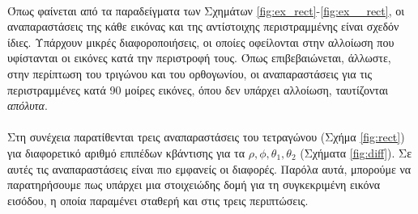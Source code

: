 \paragraph*{}
Όπως φαίνεται από τα παραδείγματα των Σχημάτων \ref{fig:ex_rect}-\ref{fig:ex__rect}, οι αναπαραστάσεις της κάθε εικόνας και της αντίστοιχης περιστραμμένης είναι σχεδόν ίδιες. Υπάρχουν μικρές διαφοροποιήσεις, οι οποίες οφείλονται στην αλλοίωση που υφίστανται οι εικόνες κατά την περιστροφή τους. Όπως επιβεβαιώνεται, άλλωστε, στην περίπτωση του τριγώνου και του ορθογωνίου, οι αναπαραστάσεις για τις περιστραμμένες κατά 90 μοίρες εικόνες, όπου δεν υπάρχει αλλοίωση, ταυτίζονται \textit{απόλυτα}.

\paragraph*{}
Στη συνέχεια παρατίθενται τρεις αναπαραστάσεις του τετραγώνου (Σχήμα \ref{fig:rect}) για διαφορετικό αριθμό επιπέδων κβάντισης για τα $\rho,\phi,\theta_1,\theta_2$ (Σχήματα \ref{fig:diff}). Σε αυτές τις αναπαραστάσεις είναι πιο εμφανείς οι διαφορές. Παρόλα αυτά, μπορούμε να παρατηρήσουμε πως υπάρχει μια στοιχειώδης δομή για τη συγκεκριμένη εικόνα εισόδου, η οποία παραμένει σταθερή και στις τρεις περιπτώσεις.

